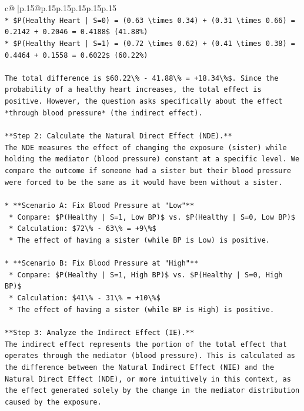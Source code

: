 \documentclass{article}
\begin{document}
{\begin{supertabular}{c@{$\;$}|p{.15\linewidth}@{}p{.15\linewidth}p{.15\linewidth}p{.15\linewidth}p{.15\linewidth}p{.15\linewidth}}
{{{\\ 
\texttt{*   \$P(Healthy Heart | S=0) = (0.63 \textbackslash{}times 0.34) + (0.31 \textbackslash{}times 0.66) = 0.2142 + 0.2046 = 0.4188\$ (41.88\%)} \\
\texttt{*   \$P(Healthy Heart | S=1) = (0.72 \textbackslash{}times 0.62) + (0.41 \textbackslash{}times 0.38) = 0.4464 + 0.1558 = 0.6022\$ (60.22\%)} \\
\\ 
\texttt{The total difference is \$60.22\textbackslash{}\% {-} 41.88\textbackslash{}\% = +18.34\textbackslash{}\%\$. Since the probability of a healthy heart increases, the total effect is positive. However, the question asks specifically about the effect *through blood pressure* (the indirect effect).} \\
\\ 
\texttt{**Step 2: Calculate the Natural Direct Effect (NDE).**} \\
\texttt{The NDE measures the effect of changing the exposure (sister) while holding the mediator (blood pressure) constant at a specific level. We compare the outcome if someone had a sister but their blood pressure were forced to be the same as it would have been without a sister.} \\
\\ 
\texttt{*   **Scenario A: Fix Blood Pressure at "Low"**} \\
\texttt{    *   Compare: \$P(Healthy | S=1, Low BP)\$ vs. \$P(Healthy | S=0, Low BP)\$} \\
\texttt{    *   Calculation: \$72\textbackslash{}\% {-} 63\textbackslash{}\% = +9\textbackslash{}\%\$} \\
\texttt{    *   The effect of having a sister (while BP is Low) is positive.} \\
\\ 
\texttt{*   **Scenario B: Fix Blood Pressure at "High"**} \\
\texttt{    *   Compare: \$P(Healthy | S=1, High BP)\$ vs. \$P(Healthy | S=0, High BP)\$} \\
\texttt{    *   Calculation: \$41\textbackslash{}\% {-} 31\textbackslash{}\% = +10\textbackslash{}\%\$} \\
\texttt{    *   The effect of having a sister (while BP is High) is positive.} \\
\\ 
\texttt{**Step 3: Analyze the Indirect Effect (IE).**} \\
\texttt{The indirect effect represents the portion of the total effect that operates through the mediator (blood pressure). This is calculated as the difference between the Natural Indirect Effect (NIE) and the Natural Direct Effect (NDE), or more intuitively in this context, as the effect generated solely by the change in the mediator distribution caused by the exposure.} \\
}}}
\end{supertabular}}
\end{document}
